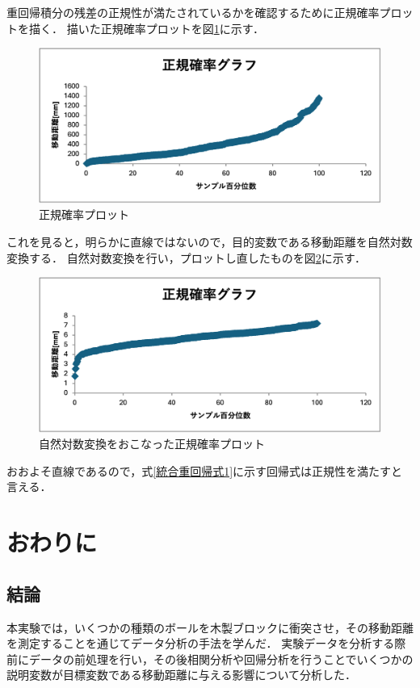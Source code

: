 \documentclass[titlepage,a4paper]{jsarticle}
\begin{document}
重回帰積分の残差の正規性が満たされているかを確認するために正規確率プロットを描く．
描いた正規確率プロットを図\ref{正規確率}に示す．
\begin{figure}[H]
  \centering
  \includegraphics[width=12cm]{img/seikikakuritu.png}
  \caption{正規確率プロット}
  \label{正規確率}
\end{figure}
これを見ると，明らかに直線ではないので，目的変数である移動距離を自然対数変換する．
自然対数変換を行い，プロットし直したものを図\ref{真正規確率}に示す．
\begin{figure}[H]
  \centering
  \includegraphics[width=12cm]{img/seikikakuritu_true.png}
  \caption{自然対数変換をおこなった正規確率プロット}
  \label{真正規確率}
\end{figure}
おおよそ直線であるので，式\eqref{統合重回帰式1}に示す回帰式は正規性を満たすと言える．
\section{おわりに}
\subsection{結論}
本実験では，いくつかの種類のボールを木製ブロックに衝突させ，その移動距離を測定することを通じてデータ分析の手法を学んだ．
実験データを分析する際前にデータの前処理を行い，その後相関分析や回帰分析を行うことでいくつかの説明変数が目標変数である移動距離に与える影響について分析した．
\end{document}
